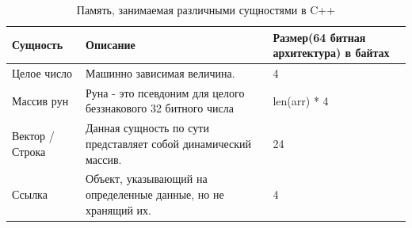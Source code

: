 \documentclass[12pt,a4paper,oneside]{report}
\begin{document}
\begin{table}[H]
	\centering
	\begin{tabular}{|p{3cm}|p{10cm}|p{3cm}|} 
		\hline
	 Сущность & Описание                                                                                                                                                                                                                                                  & Размер(64 битная архитектура) в байтах  \\ 
		\hline
		Целое число                                & Машинно зависимая величина.                                                                                                                                                                           & 4                             \\ 
		\hline
		Массив рун                                 & Руна - это псевдоним для целого беззнакового 32 битного числа~                                                                                                                                                                                            & len(arr) * 4                  \\ 
		\hline
		Вектор / Строка                                       & Данная сущность по сути представляет собой динамический массив. & 24                             \\ 
		\hline
		Ссылка                                  &  Объект, указывающий на определенные данные, но не хранящий их.                                                                                                   & 4                             \\
		\hline
	\end{tabular}
	\caption{Память, занимаемая различными сущностями в C++}
\end{table}
\end{document}
